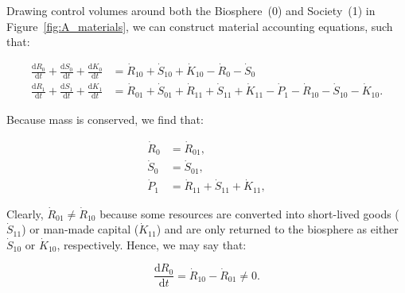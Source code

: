Drawing control volumes around both the 
Biosphere~(0) and Society~(1)
in Figure~\ref{fig:A_materials}, 
we can construct material accounting equations,
such that:

\begin{align} \label{eq:A_CV_0}
	\frac{\mathrm{d}R_0}{\mathrm{d}t}		
	+	\frac{\mathrm{d}S_0}{\mathrm{d}t}
	+	\frac{\mathrm{d}K_0}{\mathrm{d}t}			&	
	=	\dot{R}_{10}		
	+	\dot{S}_{10}	
	+	\dot{K}_{10}											
	-	\dot{R}_{0}											
	-	\dot{S}_{0}													\\
\label{eq:A_CV_1}
	\frac{\mathrm{d}R_{1}}{\mathrm{d}t}
	+ \frac{\mathrm{d}S_{1}}{\mathrm{d}t}
	+ \frac{\mathrm{d}K_{1}}{\mathrm{d}t}		&
	= \dot{R}_{01} 
	+ \dot{S}_{01} 
	+ \dot{R}_{11}
	+ \dot{S}_{11}
	+ \dot{K}_{11}
	- \dot{P}_{1}				
	- \dot{R}_{10}				
	- \dot{S}_{10}				
	- \dot{K}_{10}.
\end{align}

Because mass is conserved, we find that:

\begin{align} 
\label{eq:A_R0}
	\dot{R}_{0}				&
	= \dot{R}_{01},			\\
\label{eq:A_S0}
	\dot{S}_{0}				&
	= \dot{S}_{01},			\\
\label{eq:A_P1}
	\dot{P}_{1} 			&
	= \dot{R}_{11} 
	+ \dot{S}_{11}
	+ \dot{K}_{11},	
\end{align}



Clearly, $\dot{R}_{01} \neq \dot{R}_{10}$ 
because some resources are converted into
short-lived goods ($\dot{S}_{11}$) or man-made capital ($\dot{K}_{11}$)
and are only returned to the biosphere as either
$\dot{S}_{10}$ or $\dot{K}_{10}$, respectively. 
Hence,
we may say that:

\begin{equation}\label{eq:A_dR0_neq_0}
	\frac{\mathrm{d}R_0}{\mathrm{d}t}
	= \dot{R}_{10}
	- \dot{R}_{01}
	\neq 0.
\end{equation}


